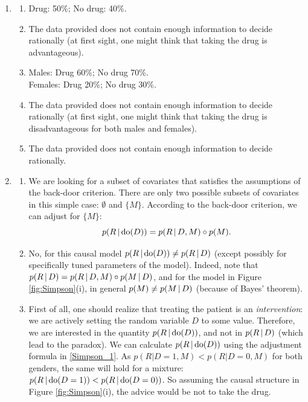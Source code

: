 \begin{gradedsolution}
  \begin{enumerate}
    \item
      \begin{enumerate}[label=\alph*)]
	\item Drug: 50\%; No drug: 40\%. 
	\item The data provided does not contain enough information to decide rationally (at first sight, one might think that taking the drug is advantageous).
	\item Males: Drug 60\%; No drug 70\%.\\
Females: Drug 20\%; No drug 30\%. 
	\item  The data provided does not contain enough information to decide rationally (at first sight, one might think that taking the drug is disadvantageous for both males and females).
	\item The data provided does not contain enough information to decide rationally.
	\end{enumerate}
    \item
      \begin{enumerate}[label=\alph*)]
	\item We are looking for a subset of covariates that satisfies the assumptions of the back-door criterion. There are only two possible
subsets of covariates in this simple case: $\emptyset$ and $\{M\}$. According to the back-door criterion, we can adjust for $\{M\}$:
$$p(R \operatorname*{|} \text{do}(D)) = p(R \operatorname*{|} D, M) \circ p(M).$$
	\item No, for this causal model $p(R \operatorname*{|} \text{do}(D)) \ne p(R \operatorname*{|} D)$ (except possibly for specifically tuned parameters of the model). Indeed,
note that $p(R \operatorname*{|} D) = p(R \operatorname*{|} D, M) \circ p(M \operatorname*{|} D)$, and for the model in Figure \ref{fig:Simpson}(i), in general $p(M) \ne p(M \operatorname*{|} D)$ (because of Bayes' theorem). 
	\item First of all, one should realize that treating the patient is an \emph{intervention}: we are actively setting the random variable $D$ to some value.
Therefore, we are interested in the quantity $p(R \operatorname*{|} \text{do}(D))$, and not in $p(R \operatorname*{|} D)$ (which lead to the paradox). We can calculate
    $p(R \operatorname*{|} \text{do}(D))$ using the adjustment formula in \ref{Simpson_1}. As $p(R|D=1,M) < p(R|D=0,M)$ for both genders, the same will hold for a mixture:
$p(R \operatorname*{|} \text{do}(D=1)) < p(R \operatorname*{|} \text{do}(D=0))$. So assuming
the causal structure in Figure \ref{fig:Simpson}(i), the advice would be not to take the drug.

\end{enumerate}
\end{enumerate}
\end{gradedsolution}
